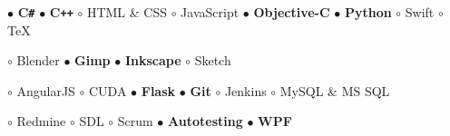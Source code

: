 \documentclass[11pt,a4paper]{article}
\begin{document}
    \bigskip



    \smallskip


    \smallskip
    $\bullet$ {\bf C\texttt{\#}}
    \hspace{0.34cm}
    $\bullet$ {\bf C\texttt{++}}
    \hspace{0.34cm}
    $\circ$ HTML \& CSS
    \hspace{0.34cm}
    $\circ$ JavaScript
    \hspace{0.34cm}
    $\bullet$ {\bf Objective-C}
    \hspace{0.34cm}
    $\bullet$ {\bf Python}
    \hspace{0.34cm}
    $\circ$ Swift
    \hspace{0.34cm}
    $\circ$ TeX


    \smallskip


    \smallskip
    $\circ$ Blender
    \hspace{0.34cm}
    $\bullet$ {\bf Gimp}
    \hspace{0.34cm}
    $\bullet$ {\bf Inkscape}
    \hspace{0.34cm}
    $\circ$ Sketch


    \smallskip


    \smallskip
    $\circ$ AngularJS
    \hspace{0.34cm}
    $\circ$ CUDA
    \hspace{0.34cm}
    $\bullet$ {\bf Flask}
    \hspace{0.34cm}
    $\bullet$ {\bf Git}
    \hspace{0.34cm}
    $\circ$ Jenkins
    \hspace{0.34cm}
    $\circ$ MySQL \& MS SQL

    \vspace{0.04cm}
    $\circ$ Redmine
    \hspace{0.34cm}
    $\circ$ SDL
    \hspace{0.34cm}
    $\circ$ Scrum
    \hspace{0.34cm}
    $\bullet$ {\bf Autotesting}
    \hspace{0.34cm}
    $\bullet$ {\bf WPF}
\end{document}
